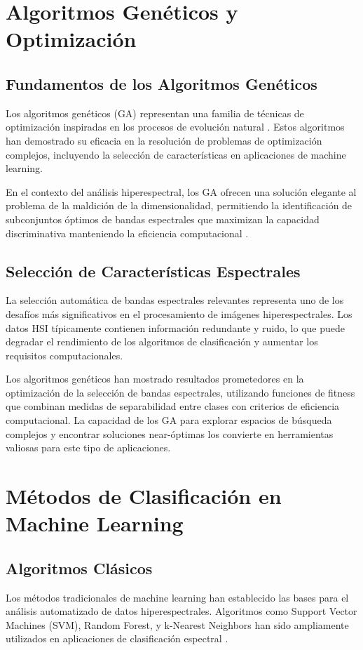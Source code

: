 \section{Algoritmos Genéticos y Optimización}

\subsection{Fundamentos de los Algoritmos Genéticos}
Los algoritmos genéticos (GA) representan una familia de técnicas de optimización inspiradas en los procesos de evolución natural \cite{goldberg1989artificial,holland1992adaptation}. Estos algoritmos han demostrado su eficacia en la resolución de problemas de optimización complejos, incluyendo la selección de características en aplicaciones de machine learning.

En el contexto del análisis hiperespectral, los GA ofrecen una solución elegante al problema de la maldición de la dimensionalidad, permitiendo la identificación de subconjuntos óptimos de bandas espectrales que maximizan la capacidad discriminativa manteniendo la eficiencia computacional \cite{herrera2008genetic,Krishna1999}.

\subsection{Selección de Características Espectrales}
La selección automática de bandas espectrales relevantes representa uno de los desafíos más significativos en el procesamiento de imágenes hiperespectrales. Los datos HSI típicamente contienen información redundante y ruido, lo que puede degradar el rendimiento de los algoritmos de clasificación y aumentar los requisitos computacionales.

Los algoritmos genéticos han mostrado resultados prometedores en la optimización de la selección de bandas espectrales, utilizando funciones de fitness que combinan medidas de separabilidad entre clases con criterios de eficiencia computacional. La capacidad de los GA para explorar espacios de búsqueda complejos y encontrar soluciones near-óptimas los convierte en herramientas valiosas para este tipo de aplicaciones.

\section{Métodos de Clasificación en Machine Learning}

\subsection{Algoritmos Clásicos}
Los métodos tradicionales de machine learning han establecido las bases para el análisis automatizado de datos hiperespectrales. Algoritmos como Support Vector Machines (SVM), Random Forest, y k-Nearest Neighbors han sido ampliamente utilizados en aplicaciones de clasificación espectral \cite{cutler2012random,scornet2015consistency}.

